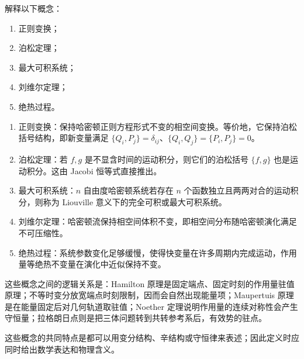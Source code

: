 
\begin{question}[概念解释]
解释以下概念：
\begin{enumerate}
  \item 正则变换；
  \item 泊松定理；
  \item 最大可积系统；
  \item 刘维尔定理；
  \item 绝热过程。
\end{enumerate}

\begin{solution}
\begin{enumerate}
  \item 正则变换：保持哈密顿正则方程形式不变的相空间变换。等价地，它保持泊松括号结构，即新变量满足 $\{Q_i,P_j\}=\delta_{ij}$、$\{Q_i,Q_j\}=\{P_i,P_j\}=0$。
  \item 泊松定理：若 $f,g$ 是不显含时间的运动积分，则它们的泊松括号 $\{f,g\}$ 也是运动积分。这由 Jacobi 恒等式直接推出。
  \item 最大可积系统：$n$ 自由度哈密顿系统若存在 $n$ 个函数独立且两两对合的运动积分，则称为 Liouville 意义下的完全可积或最大可积系统。
  \item 刘维尔定理：哈密顿流保持相空间体积不变，即相空间分布随哈密顿演化满足不可压缩性。
  \item 绝热过程：系统参数变化足够缓慢，使得快变量在许多周期内完成运动，作用量等绝热不变量在演化中近似保持不变。
\end{enumerate}


\medskip
这些概念之间的逻辑关系是：Hamilton 原理是固定端点、固定时刻的作用量驻值原理；不等时变分放宽端点时刻限制，因而会自然出现能量项；Maupertuis 原理是在能量固定后对几何轨道取驻值；Noether 定理说明作用量的连续对称性会产生守恒量；拉格朗日点则是把三体问题转到共转参考系后，有效势的驻点。


\medskip
这些概念的共同特点是都可以用变分结构、辛结构或守恒律来表述；因此定义时应同时给出数学表达和物理含义。
\end{solution}
\end{question}

